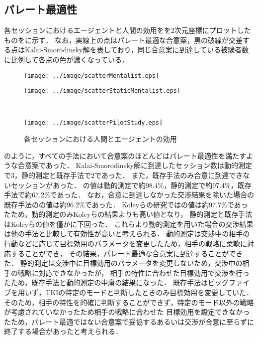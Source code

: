 \subsection{パレート最適性}
各セッションにおけるエージェントと人間の効用をを2次元座標にプロットしたものをに示す．
なお，実線上の点はパレート最適な合意案，黒の破線が交差する点はKalai-Smorodinsky解を表しており，同じ合意案に到達している被験者数に比例して各点の色が濃くなっている．

\begin{figure}[!bt]
    \begin{minipage}[b]{0.47\linewidth}
        \centering
        \texttt{[image: ../image/scatterMentalist.eps]}
        \label{fig:scatterMentalist}
    \end{minipage}
    \begin{minipage}[b]{0.47\linewidth}
        \centering
        \texttt{[image: ../image/scatterStaticMentalist.eps]}
        \label{fig:scatterStaticMentalist}
    \end{minipage}\\
    \begin{center}
        \begin{minipage}[b]{0.47\linewidth}
            \centering
            \texttt{[image: ../image/scatterPilotStudy.eps]}
            \label{fig:scatterPilotStudy}
        \end{minipage}
    \end{center}
    \caption{各セッションにおける人間とエージェントの効用}\label{fig:scatter}
\end{figure}

のように，すべての手法において合意案のほとんどはパレート最適性を満たすような合意案であった．
Kalai-Smorodinsky解に到達したセッション数は動的測定で3，静的測定と既存手法で2であった．
また，既存手法のみ合意に到達できないセッションがあった．
の値は動的測定で約98.4\%，静的測定で約97.4\%，既存手法で約67.2\%であった．
なお，合意に到達しなかった交渉結果を除いた場合の既存手法のの値は約96.2\%であった．
Koleyらの研究ではの値は約97.7\%であったため，動的測定のみKoleyらの結果よりも高い値となり，
静的測定と既存手法はKoleyらの値を僅かに下回った．
これらより動的測定を用いた場合の交渉結果は他の手法と比較して有効性が高いと考えられる．
動的測定は交渉中の相手の行動などに応じて目標効用のパラメータを変更したため，相手の戦略に柔軟に対応することができ，
その結果，パレート最適な合意案に到達することができた．
静的測定は交渉中に目標効用のパラメータを変更しないため，交渉中の相手の戦略に対応できなかったが，
相手の特性に合わせた目標効用で交渉を行ったため，既存手法と動的測定の中庸の結果になった．
既存手法はビッグファイブを用いず，TKIの特定のモードと判断したときのみ目標効用を変更していた．
そのため，相手の特性を的確に判断することができず，特定のモード以外の戦略が考慮されていなかったため相手の戦略に合わせた
目標効用を設定できなかったため，パレート最適ではない合意案で妥協するあるいは交渉が合意に至らずに終了する場合があったと考えられる．

